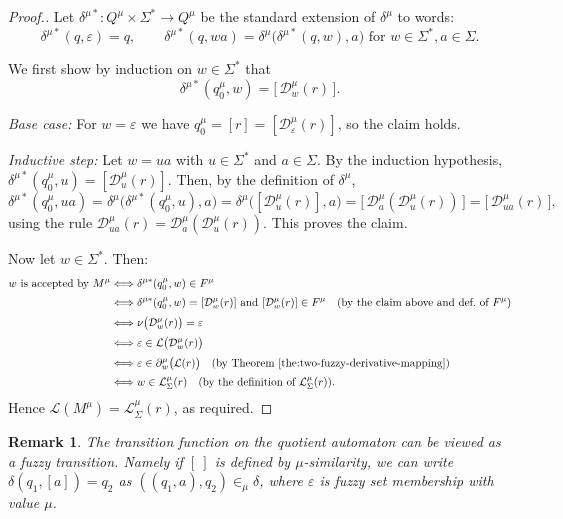 \documentclass{article}
\def\cut{\mu}
\newtheorem{remark}{Remark}[section]
\begin{document}
\begin{proof}[Proof.]
Let $\delta^{\cut *} : Q^\cut \times \Sigma^* \to Q^\cut$ be the standard
extension of $\delta^\cut$ to words:
\[
  \delta^{\cut *}(q,\varepsilon) = q,
  \qquad
  \delta^{\cut *}(q,wa) = \delta^\cut\bigl(\delta^{\cut *}(q,w),a\bigr)
  \text{ for } w \in \Sigma^*, a \in \Sigma.
\]

We first show by induction on $w \in \Sigma^*$ that
\[
  \delta^{\cut *}(q_0^\cut,w) = \bigl[\,\mathcal{D}^\cut_w(r)\,\bigr].
\]

\emph{Base case:} For $w = \varepsilon$ we have
$q_0^\cut = [r] = [\mathcal{D}^\cut_\varepsilon(r)]$, so the claim holds.

\emph{Inductive step:} Let $w = ua$ with $u \in \Sigma^*$ and $a \in \Sigma$.
By the induction hypothesis,
$\delta^{\cut *}(q_0^\cut,u) = [\mathcal{D}^\cut_u(r)]$.
Then, by the definition of $\delta^\cut$,
\[
  \delta^{\cut *}(q_0^\cut,ua)
  = \delta^\cut\bigl(\delta^{\cut *}(q_0^\cut,u),a\bigr)
  = \delta^\cut\bigl([\mathcal{D}^\cut_u(r)],a\bigr)
  = \bigl[\,\mathcal{D}^\cut_a(\mathcal{D}^\cut_u(r))\,\bigr]
  = \bigl[\,\mathcal{D}^\cut_{ua}(r)\,\bigr],
\]
using the rule $\mathcal{D}^\cut_{ua}(r) = \mathcal{D}^\cut_a(\mathcal{D}^\cut_u(r))$.
This proves the claim.

Now let $w \in \Sigma^*$. Then:
\[
\begin{aligned}
w \text{ is accepted by } M^\cut
&\Longleftrightarrow \delta^{\cut *}(q_0^\cut,w) \in F^\cut \\[0.5ex]
&\Longleftrightarrow \delta^{\cut *}(q_0^\cut,w) = [\mathcal{D}^\cut_w(r)]
             \text{ and } [\mathcal{D}^\cut_w(r)] \in F^\cut
             \quad\text{(by the claim above and def.\ of $F^\cut$)} \\[0.5ex]
&\Longleftrightarrow \nu\bigl(\mathcal{D}^\cut_w(r)\bigr) = \varepsilon \\[0.5ex]
&\Longleftrightarrow \varepsilon \in \mathcal{L}\bigl(\mathcal{D}^\cut_w(r)\bigr) \\[0.5ex]
&\Longleftrightarrow \varepsilon \in \partial^\cut_w\bigl(\mathcal{L}(r)\bigr)
     \quad\text{(by Theorem~\ref{the:two-fuzzy-derivative-mapping})} \\[0.5ex]
&\Longleftrightarrow w \in \mathcal{L}^\cut_\Sigma(r)
     \quad\text{(by the definition of $\mathcal{L}^\cut_\Sigma(r)$).}
\end{aligned}
\]
Hence $\mathcal{L}(M^\cut) = \mathcal{L}^\cut_\Sigma(r)$, as required.
\end{proof}
{\color{red}\begin{remark} The transition function on the quotient automaton can be viewed as a fuzzy  transition. Namely if $[\ ]$ is defined by $\mu$-similarity,  we can write $\delta(q_1,[a])=q_2$ as $((q_1,a),q_2)\in_\mu \delta$, where $\varepsilon$ is fuzzy set membership with value $\mu$. 
\end{remark}}
\end{document}
